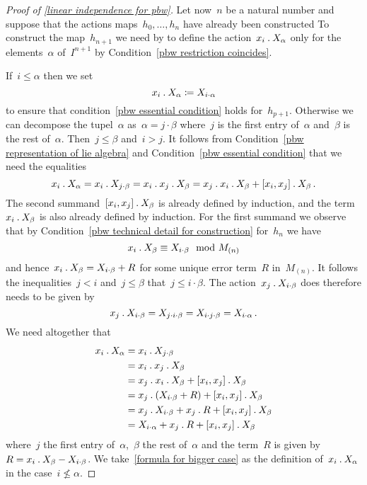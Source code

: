 \begin{proof}[Proof of \cref{linear independence for pbw}]
  Let now~$n$ be a natural number and suppose that the actions maps~$h_0, \dotsc, h_n$ have already been constructed
  To construct the map~$h_{n+1}$ we need by to define the action~$x_i \mathbin{.} X_\alpha$ only for the elements~$\alpha$ of~$I^{n+1}$ by Condition~\ref*{pbw restriction coincides}.
  
  If~$i \leq \alpha$ then we set
  \begin{equation}
    \label{formula for smaller case}
    x_i \mathbin{.} X_\alpha
    \coloneqq
    X_{i \cdot \alpha}
  \end{equation}
  to ensure that condition~\ref{pbw essential condition} holds for~$h_{p+1}$.
  Otherwise we can decompose the tupel~$\alpha$ as~$\alpha = j \cdot \beta$ where~$j$ is the first entry of~$\alpha$ and~$\beta$ is the rest of~$\alpha$.
  Then~$j \leq \beta$ and~$i > j$.
  It follows from Condition~\ref{pbw representation of lie algebra} and Condition~\ref{pbw essential condition} that we need the equalities
  \[
    x_i \mathbin{.} X_\alpha
    =
    x_i \mathbin{.} X_{j \cdot \beta}
    =
    x_i \mathbin{.} x_j \mathbin{.} X_\beta
    =
    x_j \mathbin{.} x_i \mathbin{.} X_\beta + [x_i, x_j] \mathbin{.} X_\beta  \,.
  \]
  The second summand~$[x_i, x_j] \mathbin{.} X_\beta$ is already defined by induction, and the term~$x_i \mathbin{.} X_\beta$ is also already defined by induction.
  For the first summand we observe that by Condition~\ref{pbw technical detail for construction} for~$h_n$ we have
  \[
    x_i \mathbin{.} X_\beta
    \equiv
    X_{i \cdot \beta}
    \mod
    M_{(n)}
  \]
  and hence~$x_i \mathbin{.} X_\beta = X_{i \cdot \beta} + R$ for some unique error term~$R$ in~$M_{(n)}$.
  It follows the inequalities~$j < i$ and~$j \leq \beta$ that~$j \leq i \cdot \beta$.
  The action~$x_j \mathbin{.} X_{i \cdot \beta}$ does therefore needs to be given by
  \[
    x_j \mathbin{.} X_{i \cdot \beta}
    =
    X_{j \cdot i \cdot \beta}
    =
    X_{i \cdot j \cdot \beta}
    =
    X_{i \cdot \alpha}  \,.
  \]
  We need altogether that
  \begin{align}
    x_i \mathbin{.} X_\alpha
    \notag
    &=
    x_i \mathbin{.} X_{j \cdot \beta}
    \notag
    \\
    &=
    x_i \mathbin{.} x_j \mathbin{.} X_\beta
    \notag
    \\
    &=
    x_j \mathbin{.} x_i \mathbin{.} X_\beta + [x_i, x_j] \mathbin{.} X_\beta
    \notag
    \\
    &=
    x_j \mathbin{.} (X_{i \cdot \beta} + R) + [x_i, x_j] \mathbin{.} X_\beta
    \notag
    \\
    &=
    x_j \mathbin{.} X_{i \cdot \beta} + x_j \mathbin{.} R + [x_i, x_j] \mathbin{.} X_\beta
    \notag
    \\
    &=
    X_{i \cdot \alpha} + x_j \mathbin{.} R + [x_i, x_j] \mathbin{.} X_\beta
    \label{formula for bigger case}
  \end{align}
  where~$j$ the first entry of~$\alpha$,~$\beta$ the rest of~$\alpha$ and the term~$R$ is given by~$R = x_i \mathbin{.} X_\beta - X_{i \cdot \beta}$.
  We take~\eqref{formula for bigger case} as the definition of~$x_i \mathbin{.} X_\alpha$ in the case~$i \nleq \alpha$.
  

\end{proof}

